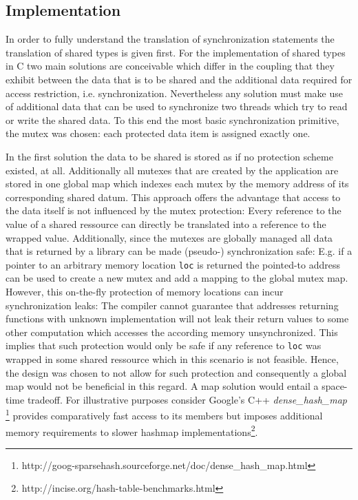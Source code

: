 
\subsection{Implementation}
In order to fully understand the translation of synchronization statements the translation of shared types is given first. For the implementation of shared types in C two main solutions are conceivable which differ in the coupling that they exhibit between the data that is to be shared and the additional data required for access restriction, i.e. synchronization. Nevertheless any solution must make use of additional data that can be used to synchronize two threads which try to read or write the shared data. To this end the most basic synchronization primitive, the mutex was chosen: each protected data item is assigned exactly one. 

In the first solution the data to be shared is stored as if no protection scheme existed, at all. Additionally all mutexes that are created by the application are stored in one global map which indexes each mutex by the memory address of its corresponding shared datum. This approach offers the advantage that access to the data itself is not influenced by the mutex protection: Every reference to the value of a shared ressource  can directly be translated into a reference to the wrapped value. Additionally, since the mutexes are globally managed all data that is returned by a library can be made (pseudo-) synchronization safe: E.g. if a pointer to an arbitrary memory location \texttt{loc} is returned the pointed-to address can be used to create a new mutex and add a mapping to the global mutex map. However, this on-the-fly protection of memory locations can incur synchronization leaks: The compiler cannot guarantee that addresses returning functions with unknown implementation will not leak their return values to some other computation which accesses the according memory unsynchronized. This implies that such protection would only be safe if any reference to \texttt{loc} was wrapped in some shared ressource which in this scenario is not feasible. Hence, the design was chosen to not allow for such protection and consequently a global map would not be beneficial in this regard. A map solution would entail a space-time tradeoff. For illustrative purposes consider Google's C++ \textit{dense\_hash\_map} \footnote{http://goog-sparsehash.sourceforge.net/doc/dense\_hash\_map.html} provides comparatively fast access to its members but imposes additional memory requirements to slower hashmap implementations\footnote{http://incise.org/hash-table-benchmarks.html}. 

